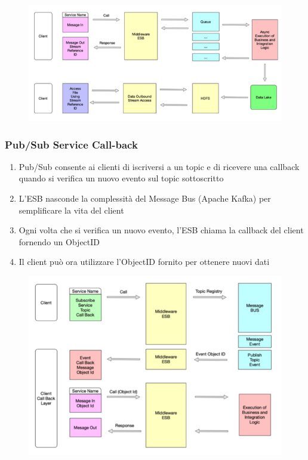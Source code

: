 \documentclass{article}
\begin{document}
\begin{figure}[htp]
    \centering
    \includegraphics[width=\linewidth]{fig/stream_outbound_file_reference.png}
    \label{fig:Stream Outbound File Reference}
\end{figure}

\subsubsection{Pub/Sub Service Call-back}
\begin{enumerate}
    \item Pub/Sub consente ai clienti di iscriversi a un topic e di ricevere una callback quando si verifica un nuovo evento sul topic sottoscritto
    \item L'ESB nasconde la complessità del Message Bus (Apache Kafka) per semplificare la vita del client
    \item Ogni volta che si verifica un nuovo evento, l'ESB chiama la callback del client fornendo un ObjectID
    \item Il client può ora utilizzare l'ObjectID fornito per ottenere nuovi dati
\end{enumerate}

\begin{figure}[htp]
    \centering
    \includegraphics[width=\linewidth]{fig/pub_sub_service_call_back.png}
    \label{fig:Pub/Sub Service Call-back}
\end{figure}
\end{document}
